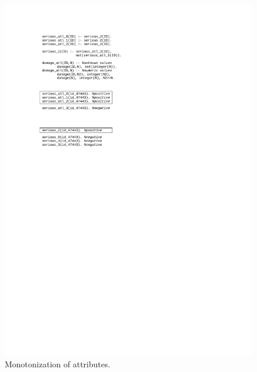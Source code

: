 \documentclass[authoryear,12pt]{elsarticle}
\begin{document}
\begin{figure}[ht]
\begin{minipage}[b]{0.5\hsize}
	\centerline{\includegraphics[width=\hsize]{img/attribute_monotonisation}}
	\caption{Monotonization of attributes.}
	\label{img:attribute_monotonization}
\end{minipage}
\end{figure}
%
%
\end{document}
